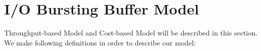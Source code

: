 \documentclass[JIP,draft]{ipsj}
\begin{document}

\section{I/O Bursting Buffer Model}


Throughput-based Model and Cost-based Model will be described in this section.
We make following definitions in order to describe our model:
\end{document}
